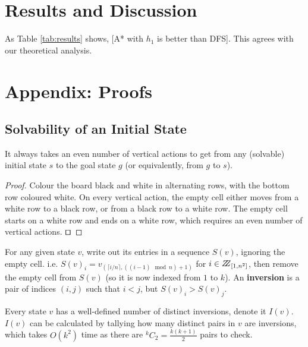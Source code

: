 \documentclass[runningheads]{llncs}
\begin{document}
\section{Results and Discussion}
As Table \ref{tab:results} shows, [A* with $h_1$ is better than DFS].
This agrees with our theoretical analysis.



\pagebreak
\appendix
\section{Appendix: Proofs}
\label{app:proofs}

\subsection{Solvability of an Initial State \cite{Solvability}}
\label{subsec:solvability}
\begin{lemma}\label{lem:evennumofvertactions}
It always takes an even number of vertical actions to get from any (solvable) initial state $s$ to the goal state $g$ (or equivalently, from $g$ to $s$).
\end{lemma}
\begin{proof}
Colour the board black and white in alternating rows, with the bottom row coloured white. On every vertical action, the empty cell either moves from a white row to a black row, or from a black row to a white row. The empty cell starts on a white row and ends on a white row, which requires an even number of vertical actions. $\qed$
\end{proof}

\begin{definition}\label{def:inversion}
For any given state $v$, write out its entries in a sequence $S(v)$, ignoring the empty cell. i.e. $S(v)_i = v_{(\lceil i/n\rceil, ((i-1) \mod n) +1)}$ for $i \in \bbbz_{[1,n^2]}$, then remove the empty cell from $S(v)$ (so it is now indexed from $1$ to $k$). An \textbf{inversion} is a pair of indices $(i,j)$ such that $i < j$, but $S(v)_i > S(v)_j$.
\end{definition}
Every state $v$ has a well-defined number of distinct inversions, denote it $I(v)$. $I(v)$ can be calculated by tallying how many distinct pairs in $v$ are inversions, which takes $O(k^2)$ time as there are $^kC_2 = \frac{k(k+1)}{2}$ pairs to check.
\end{document}
